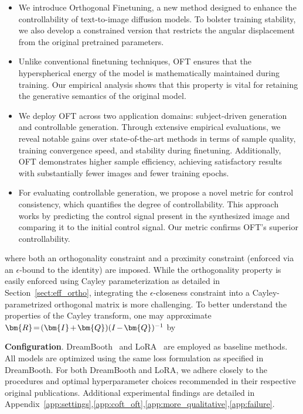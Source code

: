 \begin{itemize}[leftmargin=*,nosep]
\begin{itemize}[leftmargin=*,nosep]
    \item We introduce Orthogonal Finetuning, a new method designed to enhance the controllability of text-to-image diffusion models. To bolster training stability, we also develop a constrained version that restricts the angular displacement from the original pretrained parameters.
    \item Unlike conventional finetuning techniques, OFT ensures that the hyperspherical energy of the model is mathematically maintained during training. Our empirical analysis shows that this property is vital for retaining the generative semantics of the original model.
    \item We deploy OFT across two application domains: subject-driven generation and controllable generation. Through extensive empirical evaluations, we reveal notable gains over state-of-the-art methods in terms of sample quality, training convergence speed, and stability during finetuning. Additionally, OFT demonstrates higher sample efficiency, achieving satisfactory results with substantially fewer images and fewer training epochs.
    \item For evaluating controllable generation, we propose a novel metric for control consistency, which quantifies the degree of controllability. This approach works by predicting the control signal present in the synthesized image and comparing it to the initial control signal. Our metric confirms OFT’s superior controllability.
\end{itemize}

where both an orthogonality constraint and a proximity constraint (enforced via an $\epsilon$-bound to the identity) are imposed. While the orthogonality property is easily enforced using Cayley parameterization as detailed in Section~\ref{sect:eff_ortho}, integrating the $\epsilon$-closeness constraint into a Cayley-parametrized orthogonal matrix is more challenging. To better understand the properties of the Cayley transform, one may approximate $\thickmuskip=2mu \medmuskip=2mu \bm{R}=(\bm{I}+\bm{Q})(I-\bm{Q})^{-1}$ by

\textbf{Configuration}. DreamBooth~\cite{ruiz2023dreambooth} and LoRA~\cite{hulora2022} are employed as baseline methods. All models are optimized using the same loss formulation as specified in DreamBooth. For both DreamBooth and LoRA, we adhere closely to the procedures and optimal hyperparameter choices recommended in their respective original publications. Additional experimental findings are detailed in Appendix~\ref{app:settings},\ref{app:coft_oft},\ref{app:more_qualitative},\ref{app:failure}.


\end{itemize}
